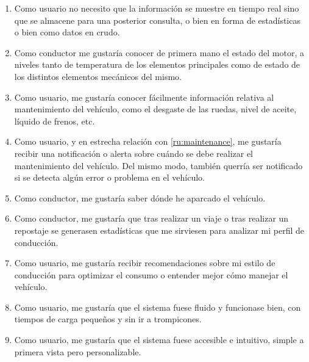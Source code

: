 \begin{enumerate}[label=\textbf{\texttt{RU-\arabic*}}]
  \item\label{ru:rt} Como usuario no necesito que la información se muestre en tiempo
        real sino que se almacene para una posterior consulta, o bien en forma de
        estadísticas o bien como datos en crudo.
  \item\label{ru:status} Como conductor me gustaría conocer de primera mano el estado
        del motor, a niveles tanto de temperatura de los elementos principales como
        de estado de los distintos elementos mecánicos del mismo.
  \item\label{ru:maintenance} Como usuario, me gustaría conocer fácilmente
        información relativa al mantenimiento del vehículo, como el desgaste de
        las ruedas, nivel de aceite, líquido de frenos, etc.
  \item\label{ru:notifications} Como usuario, y en estrecha relación con
        \ref{ru:maintenance}, me gustaría recibir una notificación o alerta sobre
        cuándo se debe realizar el mantenimiento del vehículo. Del mismo modo,
        también querría ser notificado si se detecta algún error o problema
        en el vehículo.
  \item\label{ru:parking} Como conductor, me gustaría saber dónde he aparcado el
        vehículo.
  \item\label{ru:stats} Como conductor, me gustaría que tras realizar un viaje
        o tras realizar un repostaje se generasen estadísticas que me sirviesen para
        analizar mi perfil de conducción.
  \item\label{ru:recommendations} Como usuario, me gustaría recibir recomendaciones
        sobre mi estilo de conducción para optimizar el consumo o entender mejor cómo
        manejar el vehículo.
  \item\label{ru:speed} Como usuario, me gustaría que el sistema fuese fluido y
        funcionase bien, con tiempos de carga pequeños y sin ir a trompicones.
  \item\label{ru:intuitive} Como usuario, me gustaría que el sistema fuese accesible
        e intuitivo, simple a primera vista pero personalizable.
\end{enumerate}